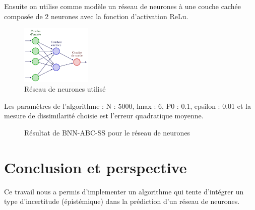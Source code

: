 \documentclass[french,12pt]{article}
\begin{document}
Ensuite on utilise comme modèle un réseau de neurones à une couche cachée composée de 2 neurones
avec la fonction d'activation ReLu.

\begin{figure}[H]
    \centering
    \includegraphics[width = 0.3\textwidth]{FNN/Images/fnnTemp.jpg}
    \caption[short]{Réseau de neurones utilisé}
\end{figure}

Les paramètres de l'algorithme :
N : 5000,
lmax : 6,
P0 : 0.1,
epsilon : 0.01 et
la mesure de dissimilarité choisie est l'erreur quadratique moyenne.

\begin{figure}[H]
    \centering
    \caption{Résultat de BNN-ABC-SS pour le réseau de neurones}
\end{figure}

\pagebreak
\section{Conclusion et perspective}
Ce travail nous a permis d'implementer un algorithme qui tente d'intégrer
un type d'incertitude (épistémique) dans la prédiction d'un réseau de
neurones.
\end{document}
